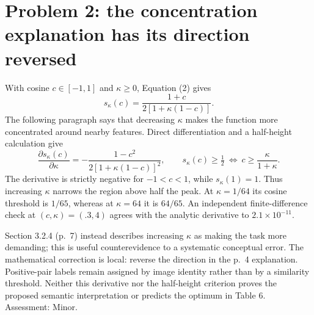 \documentclass[10pt]{article}
\begin{document}
\section*{Problem 2: the concentration explanation has its direction reversed}
With cosine \(c\in[-1,1]\) and \(\kappa\ge0\), Equation (2) gives \[s_\kappa(c)=\frac{1+c}{2[1+\kappa(1-c)]}.\] The following paragraph says that decreasing \(\kappa\) makes the function more concentrated around nearby features. Direct differentiation and a half-height calculation give \[\frac{\partial s_\kappa(c)}{\partial\kappa}
 =-\frac{1-c^2}{2[1+\kappa(1-c)]^2},\qquad
 s_\kappa(c)\ge\tfrac12\ \Longleftrightarrow\ c\ge\frac{\kappa}{1+\kappa}.\] The derivative is strictly negative for \(-1<c<1\), while \(s_\kappa(1)=1\). Thus increasing \(\kappa\) narrows the region above half the peak. At \(\kappa=1/64\) its cosine threshold is \(1/65\), whereas at \(\kappa=64\) it is \(64/65\). An independent finite-difference check at \((c,\kappa)=(.3,4)\) agrees with the analytic derivative to \(2.1\times10^{-11}\).\par
Section 3.2.4 (p. 7) instead describes increasing \(\kappa\) as making the task more demanding; this is useful counterevidence to a systematic conceptual error. The mathematical correction is local: reverse the direction in the p. 4 explanation. Positive-pair labels remain assigned by image identity rather than by a similarity threshold. Neither this derivative nor the half-height criterion proves the proposed semantic interpretation or predicts the optimum in Table 6. Assessment: Minor.\par
\end{document}

